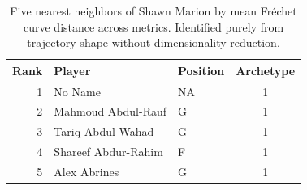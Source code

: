 \begin{table}[htbp]
  \centering\small
  \begin{tabular}{rllc}
    \toprule
    Rank & Player & Position & Archetype \\
    \midrule
    1 & No Name & NA & 1 \\
    2 & Mahmoud Abdul-Rauf & G & 1 \\
    3 & Tariq Abdul-Wahad & G & 1 \\
    4 & Shareef Abdur-Rahim & F & 1 \\
    5 & Alex Abrines & G & 1 \\
    \bottomrule
  \end{tabular}
  \caption{Five nearest neighbors of Shawn Marion by mean Fr\'{e}chet curve distance across metrics. Identified purely from trajectory shape without dimensionality reduction.}
\end{table}

